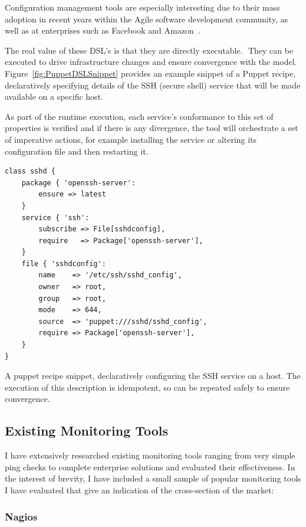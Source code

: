 \documentclass{cshonours}
\begin{document}
Configuration management tools are especially interesting due to their mass adoption in recent years within the Agile software development community, as well as at enterprises such as Facebook and Amazon~\cite{Chef}.

The real value of these DSL's is that they are directly executable.  They can be executed to drive infrastructure changes and ensure convergence with the model. Figure~\ref{fig:PuppetDSLSnippet} provides an example snippet of a Puppet recipe, declaratively specifying details of the SSH (secure shell) service that will be made available on a specific host.

As part of the runtime execution, each service's conformance to this set of properties is verified and if there is any divergence, the tool will orchestrate a set of imperative actions, for example installing the service or altering its configuration file and then restarting it.

\begin{listing}[H]
\begin{verbatim}
class sshd {
    package { 'openssh-server':
        ensure => latest
    }
    service { 'ssh':
        subscribe => File[sshdconfig],
        require   => Package['openssh-server'],
    }
    file { 'sshdconfig': 
        name    => '/etc/ssh/sshd_config',
        owner   => root,
        group   => root,
        mode    => 644,
        source  => 'puppet:///sshd/sshd_config',
        require => Package['openssh-server'],
    }
}
\end{verbatim}
\caption{A puppet recipe snippet, declaratively configuring the SSH service on a host. The execution of this description is idempotent, so can be repeated safely to ensure convergence.}
\label{fig:PuppetDSLSnippet}
\end{listing}

\clearpage
\subsection{Existing Monitoring Tools}

I have extensively researched existing monitoring tools ranging from very simple ping checks to complete enterprise solutions and evaluated their effectiveness. In the interest of brevity, I have included a small sample of popular monitoring tools I have evaluated that give an indication of the cross-section of the market:

\subsubsection{Nagios}
\end{document}
